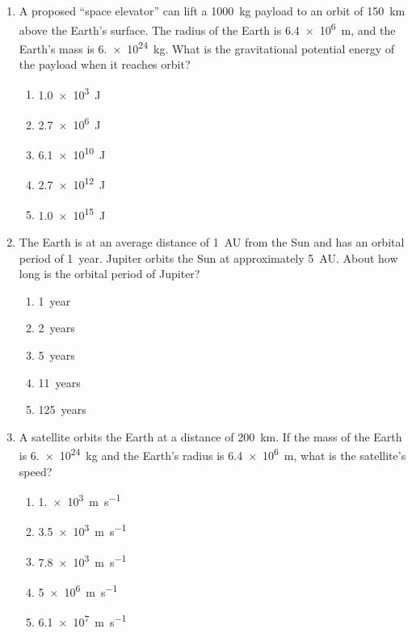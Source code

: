 \documentclass{../../../oss-apphys}
\begin{document}
\begin{multicols}{2}
\begin{enumerate}[leftmargin=18pt]
    \columnbreak
    
  \item A proposed ``space elevator'' can lift a \SI{1000}{\kilo\gram} payload
    to an orbit of \SI{150}{\kilo\metre} above the Earth's surface. The radius
    of the Earth is \SI{6.4e6}{\metre}, and the Earth's mass is
    \SI{6.e24}{\kilo\gram}. What is the gravitational potential energy of the
    payload when it reaches orbit?
    \begin{enumerate}[noitemsep,topsep=0pt,leftmargin=18pt,label=(\Alph*)]
    \item\SI{1.0e3}{\joule}
    \item\SI{2.7e6}{\joule}
    \item\SI{6.1e10}{\joule}
    \item\SI{2.7e12}{\joule}
    \item\SI{1.0e15}{\joule}
    \end{enumerate}

  \item The Earth is at an average distance of \SI{1}{AU} from the Sun and has
    an orbital period of \SI{1}{year}. Jupiter orbits the Sun at approximately
    \SI{5}{AU}. About how long is the orbital period of Jupiter?
    \begin{enumerate}[noitemsep,topsep=0pt,leftmargin=18pt,label=(\Alph*)]
    \item\SI{1}{year}
    \item\SI{2}{years}
    \item\SI{5}{years}
    \item\SI{11}{years}
    \item\SI{125}{years}
    \end{enumerate}

  \item A satellite orbits the Earth at a distance of \SI{200}{\km}. If the mass
    of the Earth is \SI{6.e24}{\kilo\gram} and the Earth's radius is
    \SI{6.4e6}{\metre}, what is the satellite's speed?
    \begin{enumerate}[noitemsep,topsep=0pt,leftmargin=18pt,label=(\Alph*)]
    \item\SI{1.e3}{\metre\per\second}
    \item\SI{3.5e3}{\metre\per\second}
    \item\SI{7.8e3}{\metre\per\second}
    \item\SI{5e6}{\metre\per\second}
    \item\SI{6.1e7}{\metre\per\second}
    \end{enumerate}


\end{enumerate}
\end{multicols}
\end{document}
